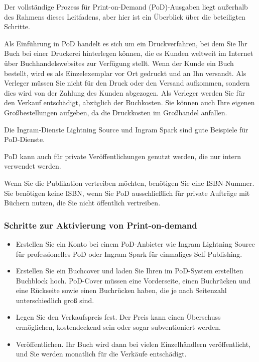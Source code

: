 \documentclass{article}
\begin{document}
Der vollständige Prozess für Print-on-Demand (PoD)-Ausgaben liegt außerhalb des Rahmens dieses Leitfadens, aber hier ist ein Überblick über die beteiligten Schritte.


Als Einführung in PoD handelt es sich um ein Druckverfahren, bei dem Sie Ihr Buch bei einer Druckerei hinterlegen können, die es Kunden weltweit im Internet über Buchhandelswebsites zur Verfügung stellt. Wenn der Kunde ein Buch bestellt, wird es als Einzelexemplar vor Ort gedruckt und an Ihn versandt. Als Verleger müssen Sie nicht für den Druck oder den Versand aufkommen, sondern dies wird von der Zahlung des Kunden abgezogen. Als Verleger werden Sie für den Verkauf entschädigt, abzüglich der Buchkosten. Sie können auch Ihre eigenen Großbestellungen aufgeben, da die Druckkosten im Großhandel anfallen.


Die Ingram-Dienste Lightning Source und Ingram Spark sind gute Beispiele für PoD-Dienste.


PoD kann auch für private Veröffentlichungen genutzt werden, die nur intern verwendet werden.


Wenn Sie die Publikation vertreiben möchten, benötigen Sie eine ISBN-Nummer. Sie benötigen keine ISBN, wenn Sie PoD ausschließlich für private Aufträge mit Büchern nutzen, die Sie nicht öffentlich vertreiben.


\subsubsection{Schritte zur Aktivierung von Print-on-demand}\label{H9836255}


\begin{itemize}
\item Erstellen Sie ein Konto bei einem PoD-Anbieter wie Ingram Lightning Source für professionelles PoD oder Ingram Spark für einmaliges Self-Publishing.


\item Erstellen Sie ein Buchcover und laden Sie Ihren im PoD-System erstellten Buchblock hoch. PoD-Cover müssen eine Vorderseite, einen Buchrücken und eine Rückseite sowie einen Buchrücken haben, die je nach Seitenzahl unterschiedlich groß sind.


\item Legen Sie den Verkaufspreis fest. Der Preis kann einen Überschuss ermöglichen, kostendeckend sein oder sogar subventioniert werden.


\item Veröffentlichen. Ihr Buch wird dann bei vielen Einzelhändlern veröffentlicht, und Sie werden monatlich für die Verkäufe entschädigt.


\end{itemize}
\end{document}
